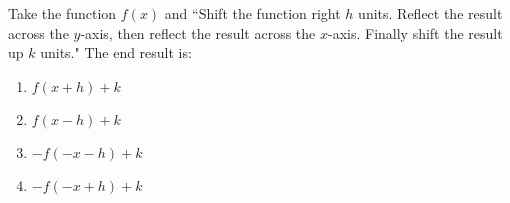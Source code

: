 \bigskip

\item Take the function $f(x)$ and ``Shift the function right $h$ units.  Reflect the result across the $y$-axis, then reflect the result across the $x$-axis.  Finally shift the result up $k$ units."  The end result is:

\begin{enumerate}
\item $f(x+h) + k$
\item $f(x-h) + k$
\item $-f(-x-h) + k$
\item $-f(-x+h) + k$
\end{enumerate}

